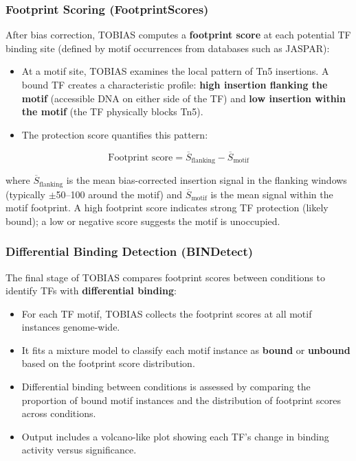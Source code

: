 \subsubsection{Footprint Scoring (FootprintScores)}

After bias correction, TOBIAS computes a \textbf{footprint score} at each potential TF binding site (defined by motif occurrences from databases such as JASPAR):

\begin{itemize}[itemsep=2pt]
  \item At a motif site, TOBIAS examines the local pattern of Tn5 insertions. A bound TF creates a characteristic profile: \textbf{high insertion flanking the motif} (accessible DNA on either side of the TF) and \textbf{low insertion within the motif} (the TF physically blocks Tn5).
  \item The protection score quantifies this pattern:
\end{itemize}

\begin{equation}
\label{eq:chromatin:footprint-score}
\text{Footprint score} = \overline{S}_{\text{flanking}} - \overline{S}_{\text{motif}}
\end{equation}

where $\overline{S}_{\text{flanking}}$ is the mean bias-corrected insertion signal in the flanking windows (typically $\pm$50--100\basepair{} around the motif) and $\overline{S}_{\text{motif}}$ is the mean signal within the motif footprint. A high footprint score indicates strong TF protection (likely bound); a low or negative score suggests the motif is unoccupied.

\subsubsection{Differential Binding Detection (BINDetect)}

The final stage of TOBIAS compares footprint scores between conditions to identify TFs with \textbf{differential binding}:
\begin{itemize}[itemsep=2pt]
  \item For each TF motif, TOBIAS collects the footprint scores at all motif instances genome-wide.
  \item It fits a mixture model to classify each motif instance as \textbf{bound} or \textbf{unbound} based on the footprint score distribution.
  \item Differential binding between conditions is assessed by comparing the proportion of bound motif instances and the distribution of footprint scores across conditions.
  \item Output includes a volcano-like plot showing each TF's change in binding activity versus significance.
\end{itemize}

